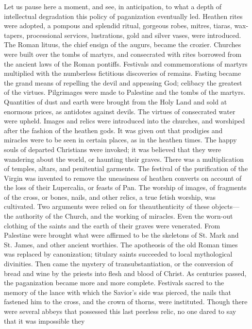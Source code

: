 Let us pause here a moment, and see, in anticipation, to what a depth of intellectual
degradation this policy of paganization eventually led. Heathen rites were adopted, a
pompous and splendid ritual, gorgeous robes, mitres, tiaras, wax-tapers, processional
services, lustrations, gold and silver vases, were introduced. The Roman lituus, the chief
ensign of the augurs, became the crozier. Churches were built over the tombs of martyrs, and
consecrated with rites borrowed from the ancient laws of the Roman pontiffs. Festivals and
commemorations of martyrs multiplied with the numberless fictitious discoveries of remains.
Fasting became the grand means of repelling the devil and appeasing God; celibacy the
greatest of the virtues. Pilgrimages were made to Palestine and the tombs of the martyrs.
Quantities of dust and earth were brought from the Holy Land and sold at enormous prices,
as antidotes against devils. The virtues of consecrated water were upheld. Images and relics
were introduced into the churches, and worshiped after the fashion of the heathen gods. It
was given out that prodigies and miracles were to be seen in certain places, as in the heathen
times. The happy souls of departed Christians were invoked; it was believed that they were
wandering about the world, or haunting their graves. There was a multiplication of temples,
altars, and penitential garments. The festival of the purification of the Virgin was invented to
remove the uneasiness of heathen converts on account of the loss of their Lupercalia, or
feasts of Pan. The worship of images, of fragments of the cross, or bones, nails, and other
relics, a true fetish worship, was cultivated. Two arguments were relied on for theauthenticity of these objects—the authority of the Church, and the working of miracles. Even
the worn-out clothing of the saints and the earth of their graves were venerated. From
Palestine were brought what were affirmed to be the skeletons of St. Mark and St. James, and
other ancient worthies. The apotheosis of the old Roman times was replaced by canonization;
titulary saints succeeded to local mythological divinities. Then came the mystery of
transubstantiation, or the conversion of bread and wine by the priests into flesh and blood of
Christ. As centuries passed, the paganization became more and more complete. Festivals
sacred to the memory of the lance with which the Savior's side was pierced, the nails that
fastened him to the cross, and the crown of thorns, were instituted. Though there were several
abbeys that possessed this last peerless relic, no one dared to say that it was impossible they
